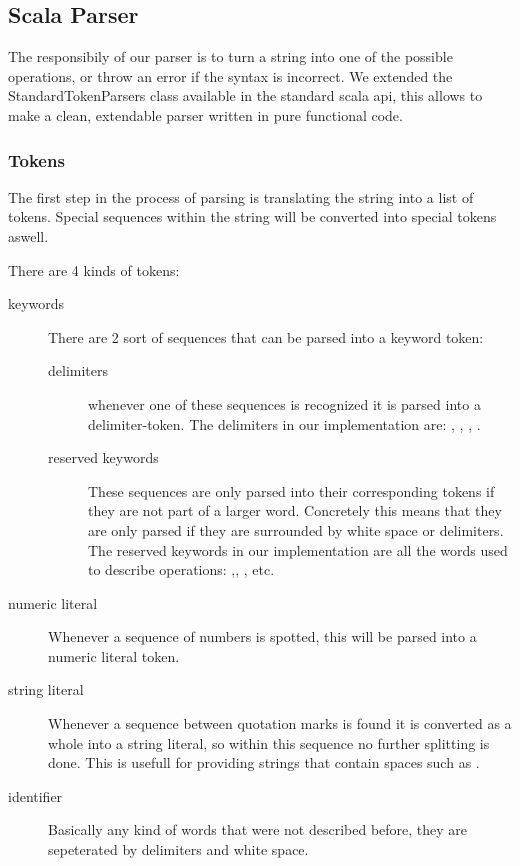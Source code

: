 \subsection{Scala Parser}

The responsibily of our parser is to turn a string into one of the possible
operations, or throw an error if the syntax is incorrect. We extended the
StandardTokenParsers class available in the standard scala api, this allows to
make a clean, extendable parser written in pure functional code.

\subsubsection{Tokens} 

The first step in the process of parsing is translating the string into a list
of tokens. Special sequences within the string will be converted into special
tokens aswell.

\par
There are 4 kinds of tokens:
\begin{description}
\item[keywords] There are 2 sort of sequences that can be parsed into a keyword
token:
	\begin{description}
	\item[delimiters] whenever one of these sequences is recognized it is parsed
	into a delimiter-token. The delimiters in our implementation are: \sn{\{},
	\sn{\}}, \sn{,}, \sn{:}.
	\item[reserved keywords] These sequences are only parsed into their
	corresponding tokens if they are not part of a larger word. Concretely this
	means that they are only parsed if they are surrounded by white space or
	delimiters. The reserved keywords in our implementation are all the words used
	to describe operations: ,, , etc.
	\end{description}
\item[numeric literal] Whenever a sequence of numbers is spotted, this will be
parsed into a numeric literal token.
\item[string literal] Whenever a sequence between quotation marks is found it is
converted as a whole into a string literal, so within this sequence no further
splitting is done. This is usefull for providing strings that contain spaces
such as .
\item[identifier] Basically any kind of words that were not described before,
they are sepeterated by delimiters and white space.
\end{description}
	
